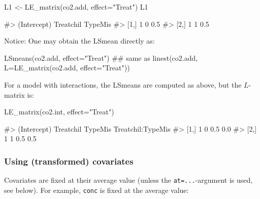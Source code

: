 \begin{Schunk}
\begin{Sinput}
L1 <- LE_matrix(co2.add, effect="Treat")
L1
\end{Sinput}
\begin{Soutput}
#>      (Intercept) Treatchil TypeMis
#> [1,]           1         0     0.5
#> [2,]           1         1     0.5
\end{Soutput}
\end{Schunk}

Notice: One may obtain the LSmean directly as:

\begin{Schunk}
\begin{Sinput}
LSmeans(co2.add, effect="Treat")
## same as
linest(co2.add, L=LE_matrix(co2.add, effect="Treat"))
\end{Sinput}
\end{Schunk}

For a model with interactions, the LSmeans are computed as above, but
the \(L\)-matrix is:

\begin{Schunk}
\begin{Sinput}
LE_matrix(co2.int, effect="Treat")
\end{Sinput}
\begin{Soutput}
#>      (Intercept) Treatchil TypeMis Treatchil:TypeMis
#> [1,]           1         0     0.5               0.0
#> [2,]           1         1     0.5               0.5
\end{Soutput}
\end{Schunk}

\hypertarget{using-transformed-covariates}{%
\subsubsection{Using (transformed)
covariates}\label{using-transformed-covariates}}

Covariates are fixed at their average value (unless the
\texttt{at=...}-argument is used, see below). For example, \texttt{conc}
is fixed at the average value:

